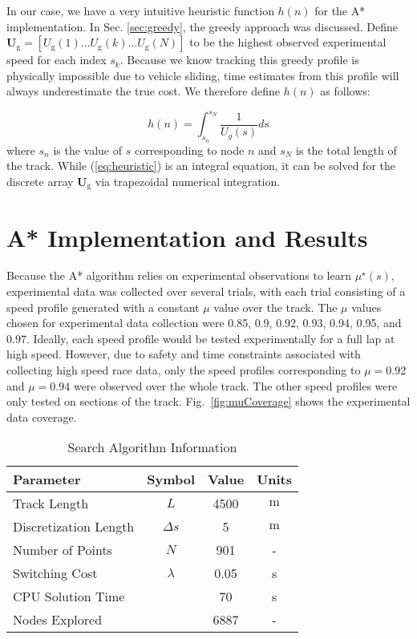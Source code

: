 {{{In our case, we have a very intuitive heuristic function $h(n)$ for the A* implementation. In Sec. \ref{sec:greedy}, the greedy approach
was discussed. Define \newline $\mathbf{U_\mathrm{g}} = [U_\mathrm{g}(1) \hdots U_\mathrm{g}(k) \hdots U_\mathrm{g}(N)]$ to be the highest observed
experimental speed for each index $s_k$. Because we know tracking this greedy profile is physically impossible due to vehicle sliding, time estimates
from this profile will always underestimate the true cost. We therefore define $h(n)$ as follows:

\begin{equation}
\label{eq:heuristic}
h(n) = \int^{s_N}_{s_n} \frac{1}{U_g(s)} ds
\end{equation}
where $s_n$ is the value of $s$ corresponding to node $n$ and $s_N$ is the total length of the track. While (\ref{eq:heuristic}) is an integral equation, it can be solved for the discrete
array $\mathbf{U}_\mathrm{g}$ via trapezoidal numerical integration.

\section{A* Implementation and Results}

Because the A* algorithm relies on experimental observations to learn $\mu^\star(s)$, experimental data was collected over several trials, with
each trial consisting of a speed profile generated with a constant $\mu$ value over the track. The $\mu$ values chosen for
experimental data collection were 0.85, 0.9, 0.92, 0.93, 0.94, 0.95, and 0.97. Ideally, each speed profile would be tested experimentally for a 
full lap at high speed. However, due to safety and time constraints associated with collecting high speed race data, only the speed profiles corresponding to $\mu = 0.92$ and $\mu = 0.94$ were observed
over the whole track. The other speed profiles were only tested on sections of the track. Fig.~\ref{fig:muCoverage} shows the experimental data coverage. 

\begin{table}[h]
\begin{center}
\caption{Search Algorithm Information}\label{tb:astarparams}
\begin{tabular}{lccc}
Parameter & Symbol & Value & Units \\\hline
Track Length       & $L$           &  4500 & $\mathrm{m} $ \\
Discretization Length               & $\Delta s$  & 5 & $\mathrm{m}$\\
Number of Points  & $N$                        & 901 & -\\
Switching Cost          & $\lambda$                        & 0.05   & s\\\hline
CPU Solution Time           &                                  &  70    & s \\
Nodes Explored              &                                  &  6887  & - \\\hline
\end{tabular}
\end{center}
\end{table}

}}}
